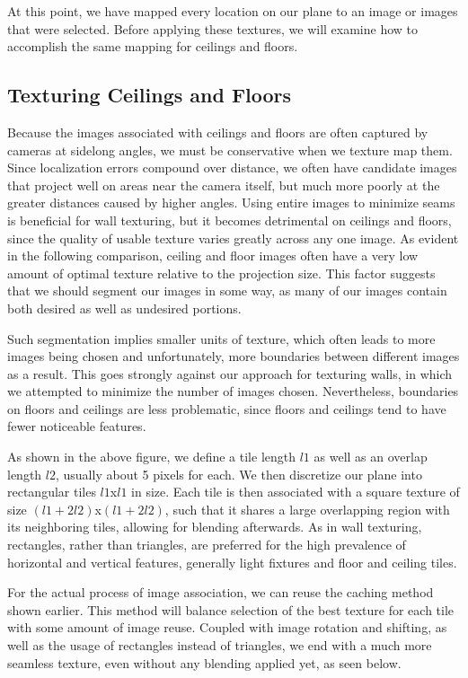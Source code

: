 \documentclass[10pt,twocolumn,letterpaper]{article}
\begin{document}
At this point, we have mapped every location on our plane to an image
or images that were selected. Before applying these textures, we will
examine how to accomplish the same mapping for ceilings and floors.

\subsection{Texturing Ceilings and Floors}

Because the images associated with ceilings and floors are often
captured by cameras at sidelong angles, we must be conservative when
we texture map them. Since localization errors compound over distance,
we often have candidate images that project well on areas near the
camera itself, but much more poorly at the greater distances caused by
higher angles. Using entire images to minimize seams is beneficial for
wall texturing, but it becomes detrimental on ceilings and floors,
since the quality of usable texture varies greatly across any one
image. As evident in the following comparison, ceiling and floor
images often have a very low amount of optimal texture relative to the
projection size. This factor suggests that we should segment our images in some way, as many of our images contain both desired as well as undesired portions.

Such segmentation
implies smaller units of texture, which often leads to more images being
chosen and unfortunately, more boundaries between different images as
a result. This goes strongly against our approach for texturing walls,
in which we attempted to minimize the number of images chosen. Nevertheless, boundaries on
floors and ceilings are less problematic, since floors and ceilings
tend to have fewer noticeable features.

As shown in the above figure, we define
a tile length $l1$ as well as an overlap length $l2$, usually about 5
pixels for each. We then discretize our plane into rectangular tiles
$l1$x$l1$ in size. Each tile is then associated with a square
texture of size $(l1+2l2)$x$(l1+2l2)$, such that it shares a large
overlapping region with its neighboring tiles, allowing for blending afterwards. As in wall texturing, rectangles, rather than triangles, are preferred for the high prevalence of horizontal and vertical features, generally light fixtures and floor and ceiling tiles.

For the actual process of image association, we can reuse the caching method shown earlier. This method will balance selection of the best texture for each tile with some amount of image reuse. Coupled with image rotation and shifting, as well as the usage of rectangles instead of triangles, we end with a much more seamless texture, even without any blending applied yet, as seen below.
\end{document}

